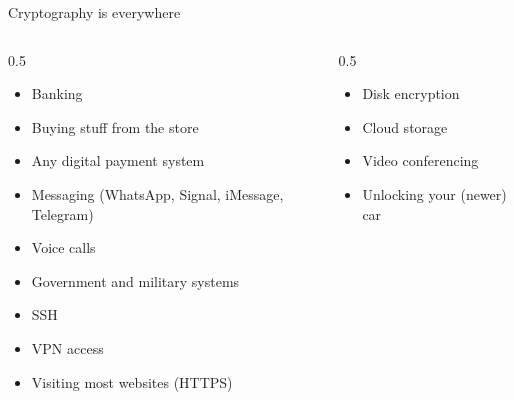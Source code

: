\documentclass[aspectratio=169, lualatex, handout]{beamer}
\begin{document}
	\begin{frame}{Cryptography is everywhere}
		\begin{columns}[c]
			\begin{column}{0.5\textwidth}
				\begin{itemize}
					\pause

					\item Banking

						\pause

					\item Buying stuff from the store

						\pause

					\item Any digital payment system

						\pause

					\item Messaging (WhatsApp, Signal, iMessage, Telegram)

						\pause

					\item Voice calls

						\pause

					\item Government and military systems

						\pause

					\item SSH

						\pause

					\item VPN access

						\pause

					\item Visiting most websites (HTTPS)
				\end{itemize}
			\end{column}

			\begin{column}{0.5\textwidth}
				\begin{itemize}
					\pause

					\item Disk encryption

						\pause

					\item Cloud storage

						\pause

					\item Video conferencing

						\pause

					\item Unlocking your (newer) car


\end{itemize}
\end{column}
\end{columns}
\end{frame}
\end{document}
